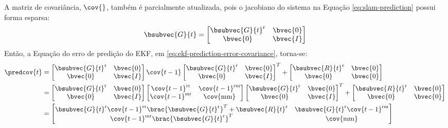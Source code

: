 A matriz de covariância, $\cov{}$, também é parcialmente atualizada, pois o jacobiano do sistema na Equação \ref{eq:slam-prediction} possui forma esparsa:
\newcommand{\slamsystemjacobian}{
  \bsubvec{G}{t} = \begin{bmatrix}
    \bsubvec{G}{t}^{\mathrm{r}} & \bvec{0} \\
    \bvec{0} & \bvec{I}
  \end{bmatrix}
}
\begin{equation}
  \slamsystemjacobian
  \label{eq:slam-system-jacobian}
\end{equation}
Então, a Equação do erro de predição do EKF, em \ref{eq:ekf-prediction-error-covariance}, torna-se:
\renewcommand{\arraystretch}{1.5}
\begin{equation}
\begin{aligned}
  \predcov{t} &= \begin{bmatrix}
    \bsubvec{G}{t}^\mathrm{r} & \bvec{0} \\
    \bvec{0} & \bvec{I}
  \end{bmatrix} \cov{t-1}  \begin{bmatrix}
    \bsubvec{G}{t}^\mathrm{r} & \bvec{0} \\
    \bvec{0} & \bvec{I}  
  \end{bmatrix}^T + \begin{bmatrix}
      \bsubvec{R}{t}^{\mathrm{r}}  & \bvec{0} \\ \bvec{0} & \bvec{0}
    \end{bmatrix} \\
  &= \begin{bmatrix}
    \bsubvec{G}{t}^\mathrm{r} & \bvec{0} \\
    \bvec{0} & \bvec{I}
  \end{bmatrix} 
  \begin{bmatrix}
    \cov{t-1}^{\mathrm{rr}} & \cov{t-1}^{\mathrm{rm}} \\
    \cov{t-1}^{\mathrm{mr}} & \cov{\mathrm{mm}}
  \end{bmatrix}  
  \begin{bmatrix}
    \bsubvec{G}{t}^\mathrm{r} & \bvec{0} \\
    \bvec{0} & \bvec{I}  
  \end{bmatrix}^T + \begin{bmatrix}
      \bsubvec{R}{t}^{\mathrm{r}} & \bvec{0} \\ \bvec{0} & \bvec{0}
    \end{bmatrix} \\
  &= \begin{bmatrix}
    \bsubvec{G}{t}^\mathrm{r} \cov{t-1}^\mathrm{rr} \brac{\bsubvec{G}{t}^\mathrm{r}}^T + \bsubvec{R}{t}^{\mathrm{r}}&  \bsubvec{G}{t}^\mathrm{r} \cov{t-1}^\mathrm{rm}\\
    \cov{t-1}^\mathrm{mr}\brac{\bsubvec{G}{t}^\mathrm{r}}^T & \cov{\mathrm{mm}} 
  \end{bmatrix} 
\end{aligned}
\label{eq:ekf-slam-prediction-error-covariance}
\end{equation}
